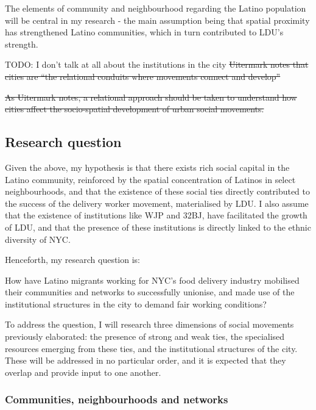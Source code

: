 \documentclass{article}
\begin{document}
The elements of community and neighbourhood regarding the Latino population will be central in my research - the main assumption being that spatial proximity has strengthened Latino communities, which in turn contributed to LDU’s strength.

TODO: I don't talk at all about the institutions in the city
\sout{Uitermark notes that cities are ``the relational conduits where movements connect and develop''} %

\sout{As Uitermark notes, a relational approach should be taken to understand how cities affect the socio-spatial development of urban social movements.} %

\subsection{Research question}

Given the above, my hypothesis is that there exists rich social capital in the Latino community, reinforced by the spatial concentration of Latinos in select neighbourhoods, and that the existence of these social ties directly contributed to the success of the delivery worker movement, materialised by LDU. 
I also assume that the existence of institutions like WJP and 32BJ, have facilitated the growth of LDU, and that the presence of these institutions is directly linked to the ethnic diversity of NYC.

Henceforth, my research question is:

\begin{center}
How have Latino migrants working for NYC's food delivery industry mobilised their communities and networks to successfully unionise, and made use of the institutional structures in the city to demand fair working conditions?
\end{center}

To address the question, I will research three dimensions of social movements previously elaborated: the presence of strong and weak ties, the specialised resources emerging from these ties, and the institutional structures of the city. 
These will be addressed in no particular order, and it is expected that they overlap and provide input to one another.

\subsubsection{Communities, neighbourhoods and networks}
\end{document}

